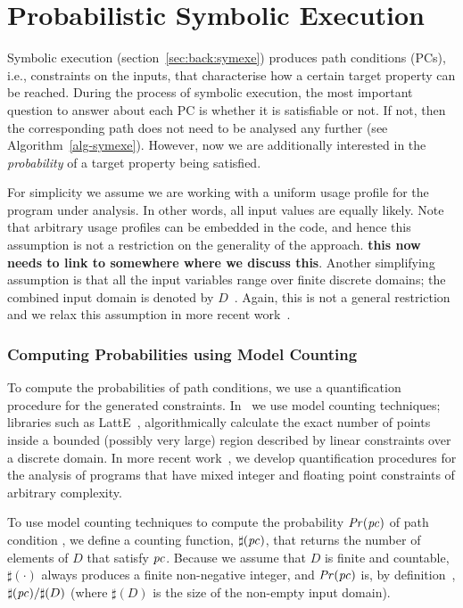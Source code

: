\section{Probabilistic Symbolic Execution}
\label{sec:pse}

Symbolic execution (section~\ref{sec:back:symexe}) produces path conditions (PCs), i.e., constraints on the inputs, that characterise how a certain target property can be reached. During the process of symbolic execution, the most important question to answer about each PC is whether it is satisfiable or not.  If not, then the corresponding path does not need to be analysed any further (see Algorithm~\ref{alg-symexe}).  However, now we are additionally interested in the \emph{probability} of a target property being satisfied. 

For simplicity we assume we are working with a uniform usage profile for the program under analysis.  In other words, all input values are equally likely.  Note that arbitrary usage profiles can be embedded in the code, and hence this assumption is not a restriction on the generality of the approach. {\bf this now needs to link to somewhere where we discuss this}. Another simplifying assumption is that all the input variables range over finite discrete domains; the combined input domain is denoted by $D$~\cite{filieri-etal-icse2013}. Again, this is not a general restriction and we relax this assumption in more recent work~\cite{Borges2014PLDI}.

\subsubsection{Computing Probabilities using Model Counting} 
To compute the probabilities of path conditions, we use a quantification procedure for the generated constraints. In~\cite{filieri-etal-icse2013} we use model counting techniques; libraries such as LattE~\cite{deLoera-etal-2012}, algorithmically calculate the exact number of points inside a bounded (possibly very large) region described by linear constraints over a discrete domain.  In more recent work~\cite{Borges2014PLDI}, we develop quantification procedures for the analysis of programs that have mixed integer and floating point constraints of arbitrary complexity.

To use model counting techniques to compute the probability $\mathit{Pr}(\mathit{pc})$ of path condition , we define a counting function, $\sharp(\mathit{pc})$, that returns the number of elements of $D$ that satisfy $\mathit{pc}$. Because we assume that $D$ is finite and countable, $\sharp(\cdot)$ always produces a finite non-negative integer, and $\mathit{Pr}(\mathit{pc})$ is, by definition~\cite{pestman2009}, $\sharp(\mathit{pc}) / \sharp(D)$ (where $\sharp(D)$ is the size of the non-empty input domain). 

